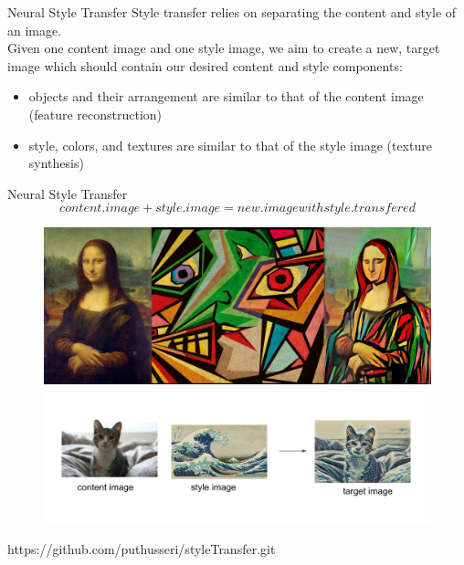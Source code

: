 \documentclass[10pt]{beamer}
\begin{document}

\begin{frame}[fragile]{Neural Style Transfer}
   Style transfer relies on separating the content and style of an image. 
   \\
   Given one content image and one style image, we aim to create a new, target image which should contain our desired content and style components:
    \begin{itemize}
        \item objects and their arrangement are similar to that of the content image (feature reconstruction)
        \item style, colors, and textures are similar to that of the style image (texture synthesis)
    \end{itemize}

\end{frame}


\begin{frame}[fragile]{Neural Style Transfer}
    \begin{equation}
        content.image + style.image =  new.image with style.transfered
    \end{equation}
    \begin{figure}[ht]
      \hspace*{-1cm}\includegraphics[width=0.5\linewidth]{styletransfer} \\
      \hspace*{-1cm}\includegraphics[width=0.7\linewidth]{styletransfercat} 
    \end{figure}
    https://github.com/puthusseri/styleTransfer.git
\end{frame}
\end{document}
